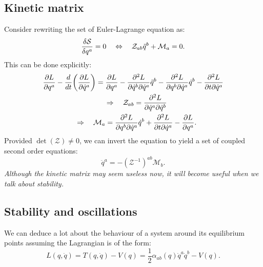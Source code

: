 \documentclass{article}
\begin{document}
\subsection{Kinetic matrix}
Consider rewriting the set of Euler-Lagrange equation as:
\begin{equation}
	\fdv{\mathcal{S}}{q^{a}} = 0 \equivalent \mathcal{Z}_{ab} \ddot{q}^{b} + \mathcal{M}_{a} = 0.
\end{equation}
This can be done explicitly:
\begin{gather}
\pdv{L}{q^{a}} - \dv{t} \qty(\pdv{L}{\dot{q}^{a}}) = \pdv{L}{q^{a}} - \pdv{L}{\dot{q}^{b}}{\dot{q}^{a}} \ddot{q}^{b} - \pdv{L}{q^{b}}{\dot{q}^{a}} \dot{q}^{b} - \pdv{L}{t}{\dot{q}^{a}} \\
\quad \Rightarrow \quad \mathcal{Z}_{ab} = \pdv{L}{\dot{q}^{a}}{\dot{q}^{b}} \\
\quad \Rightarrow \quad \mathcal{M}_{a} = \pdv{L}{q^{b}}{\dot{q}^{a}} \dot{q}^{b} + \pdv{L}{t}{\dot{q}^{a}} - \pdv{L}{q^{a}}.
\end{gather}
Provided $ \det(\mathcal{Z}) \neq 0 $, we can invert the equation to yield a set of coupled second order equations:
\begin{equation} 
	\ddot{q}^{a} = - (\mathcal{Z}^{-1})^{ab} \mathcal{M}_{b}.
\end{equation}
\textit{Although the kinetic matrix may seem useless now, it will become useful when we talk about stability.}
\subsection{Stability and oscillations}
We can deduce a lot about the behaviour of a system around its equilibrium points assuming the Lagrangian is of the form:
\begin{equation} \label{eq:stabilitylagrange}
	L(q, \dot{q}) = T(q,\dot{q}) - V(q) = \frac{1}{2} \alpha_{ab}(q) \dot{q}^{a} \dot{q}^{b} - V(q).
\end{equation}
\end{document}
